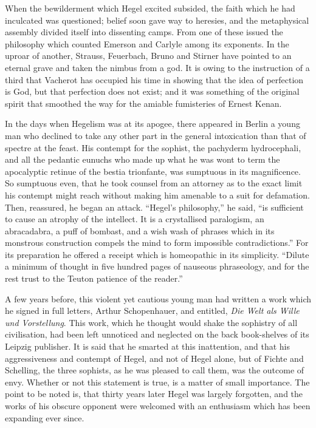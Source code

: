 \documentclass[]{book}
\begin{document}
When the bewilderment which Hegel excited subsided, the faith which he
had inculcated was questioned; belief soon gave way to heresies, and the
metaphysical assembly divided itself into dissenting camps. From one of
these issued the philosophy which counted Emerson and Carlyle among its
exponents. In the uproar of another, Strauss, Feuerbach, Bruno and
Stirner have pointed to an eternal grave and taken the nimbus from a
god. It is owing to the instruction of a third that Vacherot has
occupied his time in showing that the idea of perfection is God, but
that perfection does not exist; and it was something of the original
spirit that smoothed the way for the amiable fumisteries of Ernest
Kenan.

In the days when Hegelism was at its apogee, there appeared in Berlin a
young man who declined to take any other part in the general
intoxication than that of spectre at the feast. His contempt for the
sophist, the pachyderm hydrocephali, and all the pedantic eunuchs who
made up what he was wont to term the apocalyptic retinue of the bestia
trionfante, was sumptuous in its magnificence. So sumptuous even, that
he took counsel from an attorney as to the exact limit his contempt
might reach without making him amenable to a suit for defamation. Then,
reassured, he began an attack. ``Hegel's philosophy,'' he said, ``is
sufficient to cause an atrophy of the intellect. It is a crystallised
paralogism, an abracadabra, a puff of bombast, and a wish wash of
phrases which in its monstrous construction compels the mind to form
impossible contradictions.'' For its preparation he offered a receipt
which is homeopathic in its simplicity. ``Dilute a minimum of thought in
five hundred pages of nauseous phraseology, and for the rest trust to
the Teuton patience of the reader.''

A few years before, this violent yet cautious young man had written a
work which he signed in full letters, Arthur Schopenhauer, and entitled,
\emph{Die Welt als Wille und Vorstellung}. This work, which he thought
would shake the sophistry of all civilisation, had been left unnoticed
and neglected on the back book-shelves of its Leipzig publisher. It is
said that he smarted at this inattention, and that his aggressiveness
and contempt of Hegel, and not of Hegel alone, but of Fichte and
Schelling, the three sophists, as he was pleased to call them, was the
outcome of envy. Whether or not this statement is true, is a matter of
small importance. The point to be noted is, that thirty years later
Hegel was largely forgotten, and the works of his obscure opponent were
welcomed with an enthusiasm which has been expanding ever since.
\end{document}
